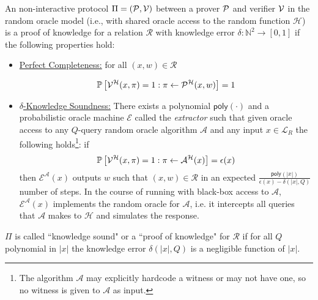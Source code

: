 \begin{definition} \label{def:ROproof}
  
An non-interactive protocol $\Pi = (\mathcal{P}, \mathcal{V})$ between a prover $\mathcal{P}$ and verifier $\mathcal{V}$ in the random oracle model (i.e., with shared oracle access to the random function $\mathcal{H}$) is a proof of knowledge for a relation $\mathcal{R}$ with knowledge error $\delta:\mathbb{N}^2 \rightarrow [0,1]$ if the following properties hold:
\begin{itemize}
\item \underline{Perfect Completeness:} for all $(x,w) \in \mathcal{R}$
\begin{small}
\[
\mathbb{P} \left[\mathcal{V}^\mathcal{H}(x, \pi) = 1  : \pi \gets \mathcal{P}^{\mathcal{H}}(x, w)
\right]  = 1 
 \]
 \end{small}
\item \underline{$\delta$-Knowledge Soundness:}
There exists a polynomial $\textsf{poly}(\cdot)$ and a probabilistic oracle machine $\mathcal{E}$ called the \emph{extractor} such that given oracle access to any $Q$-query random oracle algorithm $\mathcal{A}$ and any input $x \in \mathcal{L}_R$ the following holds\footnote{The algorithm $\mathcal{A}$ may explicitly hardcode a witness or may not have one, so no witness is given to $\mathcal{A}$ as input.}: if
\[\mathbb{P} \left[\mathcal{V}^\mathcal{H}(x, \pi) = 1  : \pi \gets \mathcal{A}^{\mathcal{H}}(x)
\right]  = \epsilon(x)\]
 then $\mathcal{E}^\mathcal{A}(x)$ outputs $w$ such that $(x, w) \in \mathcal{R}$ in an expected $\frac{\mathsf{poly}(|x|)}{\epsilon(x) - \delta(|x|, Q)}$ number of steps. In the course of running with black-box access to $\mathcal{A}$, $\mathcal{E}^\mathcal{A}(x)$ implements the random oracle for $\mathcal{A}$, i.e. it intercepts all queries that $\mathcal{A}$ makes to $\mathcal{H}$ and simulates the response. 
 \end{itemize} 
 $\Pi$ is called ``knowledge sound" or a ``proof of knowledge" for $\mathcal{R}$ if for all $Q$ polynomial in $|x|$ the knowledge error $\delta(|x|, Q)$ is a negligible function of $|x|$.  
\end{definition} 

